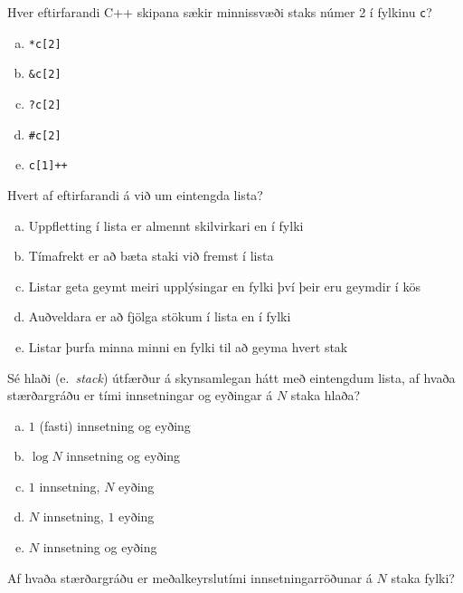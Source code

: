 \documentclass[addpoints]{exam}
\newcommand{\eng}[1]{(e.\ \emph{#1})}
\begin{document}
\begin{questions}
	\question[3]

	Hver eftirfarandi C++ skipana sækir minnissvæði staks númer 2 í fylkinu \texttt{c}?

	\begin{multicols}{5}
		\begin{enumerate}[a)]
			\item \texttt{*c[2]}
			\item \texttt{\&c[2]} %
			\item \texttt{?c[2]}
			\item \texttt{\#c[2]}
			\item \texttt{c[1]++}
		\end{enumerate}
	\end{multicols}

	\newpage

	\question[3]

	Hvert af eftirfarandi á við um eintengda lista?

	\begin{enumerate}[a)]
		\item Uppfletting í lista er almennt skilvirkari en í fylki
		\item Tímafrekt er að bæta staki við fremst í lista
		\item Listar geta geymt meiri upplýsingar en fylki því þeir eru geymdir í kös
		\item Auðveldara er að fjölga stökum í lista en í fylki %
		\item Listar þurfa minna minni en fylki til að geyma hvert stak
	\end{enumerate}

	\question[3]

	Sé hlaði \eng{stack} útfærður á skynsamlegan hátt með eintengdum lista, af hvaða stærðargráðu er tími innsetningar og eyðingar á $N$ staka hlaða?

	\begin{enumerate}[a)]
		\item  $1$ (fasti) innsetning og eyðing %
		\item  $\log N$ innsetning og eyðing
		\item  $1$ innsetning, $N$ eyðing
		\item  $N$ innsetning, $1$ eyðing
		\item  $N$ innsetning og eyðing
	\end{enumerate}

	\question[3]
	Af hvaða stærðargráðu er meðalkeyrslutími innsetningarröðunar á $N$ staka fylki?


\end{questions}
\end{document}
